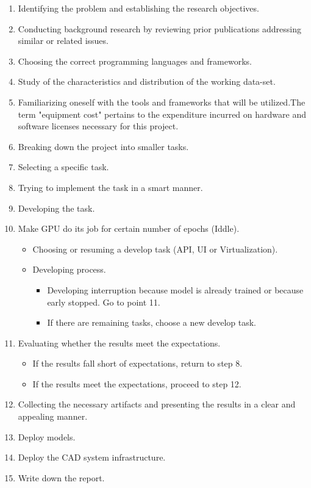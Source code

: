 \begin{enumerate}

    \item Identifying the problem and establishing the research objectives.
    \item Conducting background research by reviewing prior publications addressing similar or related issues.
    \item Choosing the correct programming languages and frameworks.
    \item Study of the characteristics and distribution of the working data-set.
    \item Familiarizing oneself with the tools and frameworks that will be utilized.The term "equipment cost" pertains to the expenditure incurred on hardware and software licenses necessary for this project.
    \item Breaking down the project into smaller tasks.
    \item Selecting a specific task.
    \item Trying to implement the task in a smart manner.
    \item Developing the task.
    \item Make GPU do its job for certain number of epochs (Iddle).

        \begin{itemize}
            \item Choosing or resuming a develop task (API, UI or Virtualization).
            \item Developing process.
                \begin{itemize}
                    \item Developing interruption because model is already trained or because early stopped. Go to point 11.
                     \item If there are remaining tasks, choose a new develop task.
                \end{itemize}
        \end{itemize}


    \item Evaluating whether the results meet the expectations.

        \begin{itemize}
            \item If the results fall short of expectations, return to step 8.
            \item If the results meet the expectations, proceed to step 12.
        \end{itemize}

    \item Collecting the necessary artifacts and presenting the results in a clear and appealing manner.

    \item Deploy models.

    \item Deploy the CAD system infrastructure.

    \item Write down the report.

\end{enumerate}

